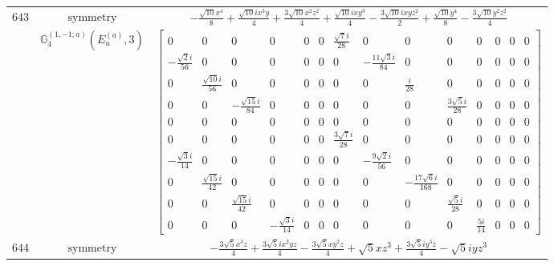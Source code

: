 \documentclass[fleqn,8pt,landscape]{jsarticle}
\begin{document}
\begin{longtable}{ccc}
$ 643 $ & $ \text{symmetry} $ & $ - \frac{\sqrt{10} x^{4}}{8} + \frac{\sqrt{10} i x^{3} y}{4} + \frac{3 \sqrt{10} x^{2} z^{2}}{4} + \frac{\sqrt{10} i x y^{3}}{4} - \frac{3 \sqrt{10} i x y z^{2}}{2} + \frac{\sqrt{10} y^{4}}{8} - \frac{3 \sqrt{10} y^{2} z^{2}}{4} $ \\
$  $ & $ \mathbb{G}_{4}^{(1,-1;a)}(E_{u}^{(a)},3) $ & $ \begin{bmatrix} 0 & 0 & 0 & 0 & 0 & 0 & \frac{\sqrt{7} i}{28} & 0 & 0 & 0 & 0 & 0 & 0 & 0 \\ - \frac{\sqrt{2} i}{56} & 0 & 0 & 0 & 0 & 0 & 0 & - \frac{11 \sqrt{3} i}{84} & 0 & 0 & 0 & 0 & 0 & 0 \\ 0 & \frac{\sqrt{10} i}{56} & 0 & 0 & 0 & 0 & 0 & 0 & \frac{i}{28} & 0 & 0 & 0 & 0 & 0 \\ 0 & 0 & - \frac{\sqrt{15} i}{84} & 0 & 0 & 0 & 0 & 0 & 0 & \frac{3 \sqrt{5} i}{28} & 0 & 0 & 0 & 0 \\ 0 & 0 & 0 & 0 & 0 & 0 & 0 & 0 & 0 & 0 & 0 & 0 & 0 & 0 \\ 0 & 0 & 0 & 0 & 0 & 0 & \frac{3 \sqrt{7} i}{28} & 0 & 0 & 0 & 0 & 0 & 0 & 0 \\ - \frac{\sqrt{3} i}{14} & 0 & 0 & 0 & 0 & 0 & 0 & - \frac{9 \sqrt{2} i}{56} & 0 & 0 & 0 & 0 & 0 & 0 \\ 0 & \frac{\sqrt{15} i}{42} & 0 & 0 & 0 & 0 & 0 & 0 & - \frac{17 \sqrt{6} i}{168} & 0 & 0 & 0 & 0 & 0 \\ 0 & 0 & \frac{\sqrt{15} i}{42} & 0 & 0 & 0 & 0 & 0 & 0 & \frac{\sqrt{5} i}{28} & 0 & 0 & 0 & 0 \\ 0 & 0 & 0 & - \frac{\sqrt{3} i}{14} & 0 & 0 & 0 & 0 & 0 & 0 & \frac{5 i}{14} & 0 & 0 & 0 \end{bmatrix} $ \\ \hline
$ 644 $ & $ \text{symmetry} $ & $ - \frac{3 \sqrt{5} x^{3} z}{4} + \frac{3 \sqrt{5} i x^{2} y z}{4} - \frac{3 \sqrt{5} x y^{2} z}{4} + \sqrt{5} x z^{3} + \frac{3 \sqrt{5} i y^{3} z}{4} - \sqrt{5} i y z^{3} $ \\

\end{longtable}
\end{document}
